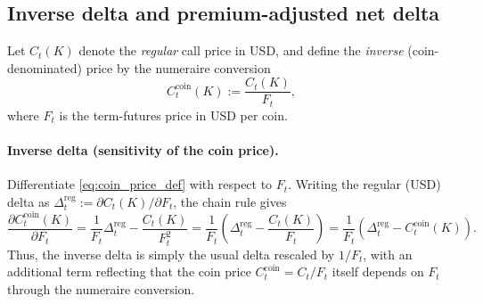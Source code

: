 \documentclass[a4paper,titlepage,12pt]{report}
\theoremstyle{plain}
\begin{document}

\subsection{Inverse delta and premium-adjusted net delta}
\label{subsec:net_delta}

Let $C_t(K)$ denote the \emph{regular} call price in USD, and define the \emph{inverse} (coin-denominated) price by the numeraire conversion
\begin{equation}
C^{\mathrm{coin}}_t(K) := \frac{C_t(K)}{F_t},
\label{eq:coin_price_def}
\end{equation}
where $F_t$ is the term-futures price in USD per coin.

\paragraph{Inverse delta (sensitivity of the coin price).}
Differentiate \eqref{eq:coin_price_def} with respect to $F_t$.
Writing the regular (USD) delta as $\Delta_t^{\mathrm{reg}} := \partial C_t(K)/\partial F_t$, the
chain rule gives
\begin{equation}
\frac{\partial C^{\mathrm{coin}}_t(K)}{\partial F_t}
=
\frac{1}{F_t}\Delta_t^{\mathrm{reg}}
-\frac{C_t(K)}{F_t^2}
=
\frac{1}{F_t}\left(\Delta_t^{\mathrm{reg}}-\frac{C_t(K)}{F_t}\right)
=
\frac{1}{F_t}\left(\Delta_t^{\mathrm{reg}}-C_t^{\mathrm{coin}}(K)\right).
\label{eq:inverse_delta_coin}
\end{equation}
Thus, the inverse delta is simply the usual delta rescaled by $1/F_t$, with an additional term
reflecting that the coin price $C^{\mathrm{coin}}_t=C_t/F_t$ itself depends on $F_t$ through the
numeraire conversion.
\end{document}

